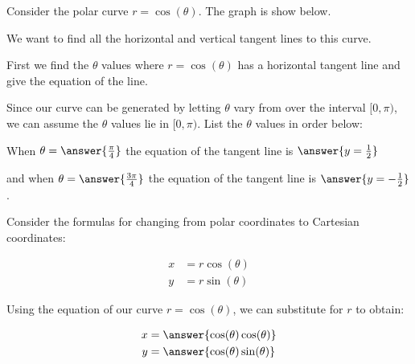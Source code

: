 \documentclass{ximera}
\author{Jason Miller}
\begin{document}
\begin{exercise}


Consider the polar curve $r=\cos(\theta)$. The graph is show below. 




\begin{image}  
\end{image} 

We want to find all the horizontal and vertical tangent lines to this curve.

First we find the $\theta$ values where $r=\cos(\theta)$ has a horizontal tangent line and give the equation of the line. 

Since our curve can be generated by letting $\theta$ vary from over the interval $[0, \pi)$, we can assume the $\theta$ values lie in $[0, \pi)$. List the $\theta$ values in order below: 


When $\theta=\answer{\frac{\pi}{4}}$ the equation of the tangent line is $\answer{y=\frac{1}{2}  }$ 

and when $\theta=\answer{\frac{3\pi}{4}}$ the equation of the tangent line is $\answer{y=-\frac{1}{2}}$. 




\begin{hint}

Consider the formulas for changing from polar coordinates to Cartesian coordinates:

\begin{align*}
x&=r\cos(\theta) \\
y&=r\sin(\theta)
\end{align*}

Using the equation of our curve $r=\cos(\theta)$, we can substitute for $r$ to obtain:

\begin{align*}
x&=\answer{\cos(\theta)\cos(\theta)} \\
y&=\answer{\cos(\theta)\sin(\theta) }
\end{align*}


\end{hint}
\end{exercise}
\end{document}
